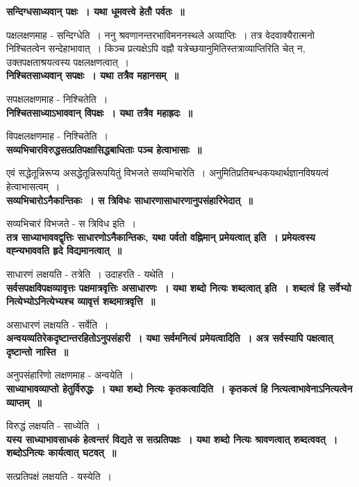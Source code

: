 	{\bfseries सन्दिग्धसाध्यवान् पक्षः~। यथा धूमवत्त्वे हेतौ पर्वतः~॥}\par
		पक्षलक्षणमाह - सन्दिग्धेति~। ननु श्रवणानन्तरभाविमननस्थले अव्याप्तिः~। तत्र वेदवाक्यैरात्मनो निश्चितत्वेन सन्देहाभावात्~। किञ्च प्रत्यक्षेऽपि वह्नौ यत्रेच्छयानुमितिस्तत्राव्याप्तिरिति चेत् न, उक्तपक्षताश्रयत्वस्य पक्षलक्षणत्वात्~।\\[10pt]
	{\bfseries निश्चितसाध्यवान् सपक्षः~। यथा तत्रैव महानसम्~॥}\par
		सपक्षलक्षणमाह - निश्चितेति~।\\[10pt]
	{\bfseries निश्चितसाध्याऽभाववान् विपक्षः~। यथा तत्रैव महाह्रदः~॥}\par
		विपक्षलक्षणमाह - निश्चितेति~।\\[10pt]
	{\bfseries सव्यभिचारविरुद्धसत्प्रतिपक्षासिद्धबाधिताः पञ्च हेत्वाभासाः~॥}\par
		एवं सद्धेतून्निरूप्य असद्धेतून्निरूपयितुं विभजते सव्यभिचारेति~। अनुमितिप्रतिबन्धकयथार्थज्ञानविषयत्वं हेत्वाभासत्वम्~।\\[10pt]
	{\bfseries सव्यभिचारोऽनैकान्तिकः~। स त्रिविधः साधारणासाधारणानुपसंहारिभेदात्~॥}\par
		सव्यभिचारं विभजते - स त्रिविध इति~।\\[10pt]
	{\bfseries तत्र साध्याभाववद्वृत्तिः साधारणोऽनैकान्तिकः, यथा पर्वतो वह्निमान् प्रमेयत्वात् इति~। प्रमेयत्वस्य वह्न्यभाववति हृदे विद्यमानत्वात्~॥}\par
		साधारणं लक्षयति - तत्रेति~। उदाहरति - यथेति~।\\[10pt]
	{\bfseries सर्वसपक्षविपक्षव्यावृत्तः पक्षमात्रवृत्तिः असाधारणः~। यथा शब्दो नित्यः शब्दत्वात् इति~। शब्दत्वं हि सर्वेभ्यो नित्येभ्योऽनित्येभ्यश्च व्यावृत्तं शब्दमात्रवृत्ति~॥}\par
		असाधारणं लक्षयति - सर्वेति~।\\[10pt]
	{\bfseries अन्वयव्यतिरेकदृष्टान्तरहितोऽनुपसंहारी~। यथा सर्वमनित्यं प्रमेयत्वादिति~। अत्र सर्वस्यापि पक्षत्वात् दृष्टान्तो नास्ति~॥}\par
		अनुपसंहारिणो लक्षणमाह - अन्वयेति~।\\[10pt]
	{\bfseries साध्याभावव्याप्तो हेतुर्विरुद्धः~। यथा शब्दो नित्यः कृतकत्वादिति~। कृतकत्वं हि नित्यत्वाभावेनाऽनित्यत्वेन व्याप्तम्~॥}\par
		विरुद्धं लक्षयति - साध्येति~।\\[10pt]
	{\bfseries यस्य साध्याभावसाधकं हेत्वन्तरं विद्यते स सत्प्रतिपक्षः~। यथा शब्दो नित्यः श्रावणत्वात् शब्दत्ववत्~। शब्दोऽनित्यः कार्यत्वात् घटवत्~॥}\par
		सत्प्रतिपक्षं लक्षयति - यस्येति~।\\[10pt]
